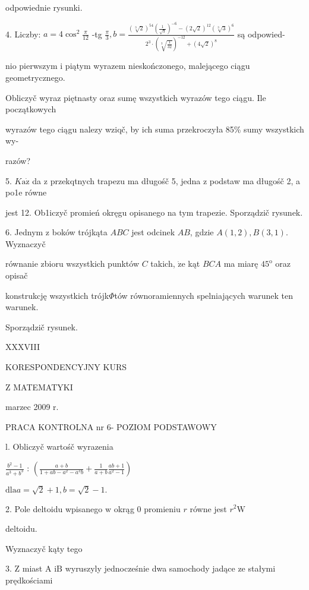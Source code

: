 \documentclass[a4paper,12pt]{article}
\begin{document}
odpowiednie rysunki.

4. Liczby: $a = 4\displaystyle \cos^{2}\frac{\pi}{12}$ -tg $\displaystyle \frac{\pi}{3}, b = \displaystyle \frac{(\sqrt[3]{2})^{54}(\frac{1}{\sqrt{3}})^{-6}-(2\sqrt{2})^{12}(\sqrt[3]{3})^{6}}{2^{3}\cdot(\sqrt[3]{\frac{1}{32}})^{-12}+(4\sqrt{2})^{8}}$ są odpowied-

nio pierwszym $\mathrm{i}$ piątym wyrazem nieskończonego, malejącego ciągu geometrycznego.

Obliczyč wyraz piętnasty oraz sumę wszystkich wyrazów tego ciągu. Ile początkowych

wyrazów tego ciągu nalezy wziqč, by ich suma przekroczyła 85\% sumy wszystkich wy-

razów?

5. $K\mathrm{a}\dot{\mathrm{z}}$ da $\mathrm{z}$ przekqtnych trapezu ma długośč 5, jedna $\mathrm{z}$ podstaw ma długośč 2, a po1e równe

jest 12. Ob1iczyč promień okręgu opisanego na tym trapezie. Sporządzič rysunek.

6. Jednym $\mathrm{z}$ boków trójkąta $ABC$ jest odcinek $AB$, gdzie $A(1,2), B(3,1)$. Wyznaczyč

równanie zbioru wszystkich punktów $C$ takich, $\dot{\mathrm{z}}\mathrm{e}$ kąt $BCA$ ma miarę $45^{\mathrm{o}}$ oraz opisač

konstrukcję wszystkich trójk$\Phi$tów równoramiennych spelniających warunek ten warunek.

Sporządzič rysunek.





XXXVIII

KORESPONDENCYJNY KURS

Z MATEMATYKI

marzec 2009 r.

PRACA KONTROLNA nr 6- POZIOM PODSTAWOWY

l. Obliczyč wartośč wyrazenia

$\displaystyle \frac{b^{2}-1}{a^{3}+b^{3}}$ : $(\displaystyle \frac{a+b}{1+ab-a^{2}-a^{3}b}+\frac{1}{a+b}\frac{ab+1}{a^{2}-1})$

$\mathrm{d}\mathrm{l}\mathrm{a}a=\sqrt{2}+1, b=\sqrt{2}-1.$

2. Pole deltoidu wpisanego $\mathrm{w}$ okrąg $0$ promieniu $r$ równe jest $r^{2} \mathrm{W}$

deltoidu.

Wyznaczyč kąty tego

3. $\mathrm{Z}$ miast A $\mathrm{i}\mathrm{B}$ wyruszyly jednocześnie dwa samochody jadące ze stałymi prędkościami
\end{document}
